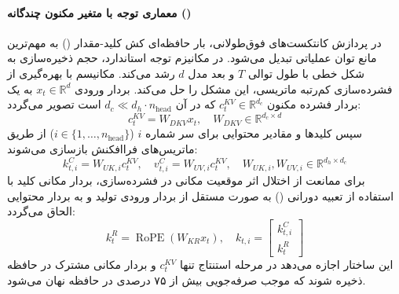 \paragraph*{معماری توجه با متغیر مکنون چندگانه ()}
در پردازش کانتکست‌های فوق‌طولانی، بار حافظه‌ای کش کلید-مقدار () به مهم‌ترین مانع توان عملیاتی تبدیل می‌شود. در مکانیزم توجه استاندارد، حجم ذخیره‌سازی به شکل خطی با طول توالی $T$ و بعد مدل $d$ رشد می‌کند. مکانیسم  با بهره‌گیری از فشرده‌سازی کم‌رتبه ماتریسی، این مشکل را حل می‌کند. بردار ورودی $x_t \in \mathbb{R}^d$ به یک بردار فشرده مکنون $c_t^{KV} \in \mathbb{R}^{d_c}$ که در آن $d_c \ll d_h \cdot n_{\text{head}}$ است تصویر می‌گردد:
\begin{equation}
    c_t^{KV} = W_{DKV} x_t, \quad W_{DKV} \in \mathbb{R}^{d_c \times d}
\end{equation}
سپس کلیدها و مقادیر محتوایی برای سر شماره $i$ ($i \in \{1, \dots, n_{\text{head}}\}$) از طریق ماتریس‌های فراافکنش بازسازی می‌شوند:
\begin{equation}
    k_{t, i}^C = W_{UK, i} c_t^{KV}, \quad v_{t, i}^C = W_{UV, i} c_t^{KV}, \quad W_{UK, i}, W_{UV, i} \in \mathbb{R}^{d_h \times d_c}
\end{equation}
برای ممانعت از اختلال اثر موقعیت مکانی در فشرده‌سازی، بردار مکانی کلید با استفاده از تعبیه دورانی () \cite{su2024roformer} به صورت مستقل از بردار ورودی تولید و به بردار محتوایی الحاق می‌گردد:
\begin{equation}
    k_t^R = \operatorname{RoPE}(W_{KR} x_t), \quad k_{t, i} = \begin{bmatrix} k_{t, i}^C \\ k_t^R \end{bmatrix}
\end{equation}
این ساختار اجازه می‌دهد در مرحله استنتاج تنها $c_t^{KV}$ و بردار مکانی مشترک در حافظه ذخیره شوند که موجب صرفه‌جویی بیش از ۷۵ درصدی در حافظه نهان می‌شود.

